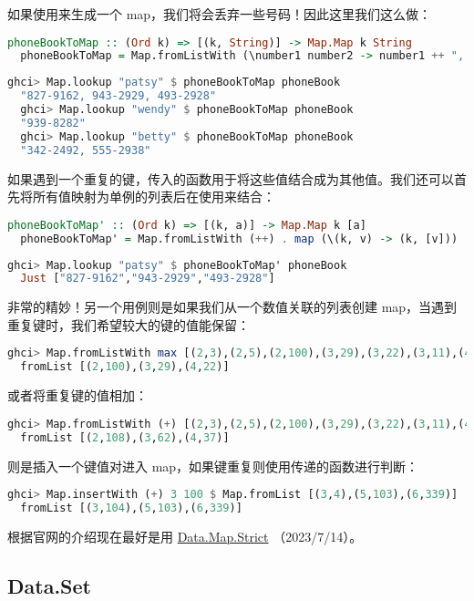 \documentclass[./main.tex]{subfiles}
\begin{document}
如果使用来生成一个 map，我们将会丢弃一些号码！因此这里我们这么做：

\begin{lstlisting}[language=Haskell]
  phoneBookToMap :: (Ord k) => [(k, String)] -> Map.Map k String
  phoneBookToMap = Map.fromListWith (\number1 number2 -> number1 ++ ", " ++ number2)
\end{lstlisting}

\begin{lstlisting}[language=Haskell]
  ghci> Map.lookup "patsy" $ phoneBookToMap phoneBook
  "827-9162, 943-2929, 493-2928"
  ghci> Map.lookup "wendy" $ phoneBookToMap phoneBook
  "939-8282"
  ghci> Map.lookup "betty" $ phoneBookToMap phoneBook
  "342-2492, 555-2938"
\end{lstlisting}

如果遇到一个重复的键，传入的函数用于将这些值结合成为其他值。我们还可以首先将所有值映射为单例的列表后在使用\acode{++}来结合：

\begin{lstlisting}[language=Haskell]
  phoneBookToMap' :: (Ord k) => [(k, a)] -> Map.Map k [a]
  phoneBookToMap' = Map.fromListWith (++) . map (\(k, v) -> (k, [v]))
\end{lstlisting}

\begin{lstlisting}[language=Haskell]
  ghci> Map.lookup "patsy" $ phoneBookToMap' phoneBook
  Just ["827-9162","943-2929","493-2928"]
\end{lstlisting}

非常的精妙！另一个用例则是如果我们从一个数值关联的列表创建 map，当遇到重复键时，我们希望较大的键的值能保留：

\begin{lstlisting}[language=Haskell]
  ghci> Map.fromListWith max [(2,3),(2,5),(2,100),(3,29),(3,22),(3,11),(4,22),(4,15)]
  fromList [(2,100),(3,29),(4,22)]
\end{lstlisting}

或者将重复键的值相加：

\begin{lstlisting}[language=Haskell]
  ghci> Map.fromListWith (+) [(2,3),(2,5),(2,100),(3,29),(3,22),(3,11),(4,22),(4,15)]
  fromList [(2,108),(3,62),(4,37)]
\end{lstlisting}

则是插入一个键值对进入 map，如果键重复则使用传递的函数进行判断：

\begin{lstlisting}[language=Haskell]
  ghci> Map.insertWith (+) 3 100 $ Map.fromList [(3,4),(5,103),(6,339)]
  fromList [(3,104),(5,103),(6,339)]
\end{lstlisting}

根据官网的介绍现在最好是用
\href{https://downloads.haskell.org/ghc/latest/docs/libraries/containers-0.6.7/Data-Map.html}{Data.Map.Strict}
（2023/7/14）。

\subsection*{Data.Set}

\end{document}
